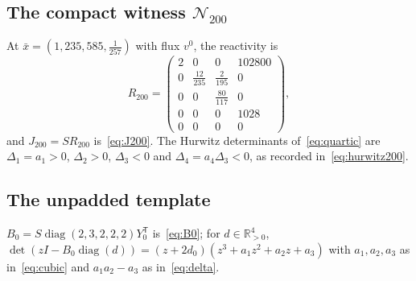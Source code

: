 \documentclass[11pt,a4paper]{article}
\theoremstyle{plain}
\theoremstyle{definition}
\theoremstyle{remark}
\newcommand{\R}{\mathbb{R}}
\newcommand{\diag}{\operatorname{diag}}
\newcommand{\xbar}{\bar{x}}
\begin{document}
\subsection*{The compact witness $\mathcal N_{200}$}
At $\xbar=(1,235,585,\frac1{257})$ with flux $v^0$, the reactivity is
\[
R_{200}=\begin{pmatrix}2&0&0&102800\\0&\frac{12}{235}&\frac{2}{195}&0\\0&0&\frac{80}{117}&0\\0&0&0&1028\\0&0&0&0\end{pmatrix},
\]
and $J_{200}=SR_{200}$ is~\eqref{eq:J200}. The Hurwitz determinants of~\eqref{eq:quartic} are $\Delta_1=a_1>0$, $\Delta_2>0$, $\Delta_3<0$ and $\Delta_4=a_4\Delta_3<0$, as recorded in~\eqref{eq:hurwitz200}.

\subsection*{The unpadded template}
$B_0=S\diag(2,3,2,2,2)Y_0^{\mathsf T}$ is~\eqref{eq:B0}; for $d\in\R^4_{>0}$, $\det(zI-B_0\diag(d))=(z+2d_0)(z^3+a_1z^2+a_2z+a_3)$ with $a_1,a_2,a_3$ as in~\eqref{eq:cubic} and $a_1a_2-a_3$ as in~\eqref{eq:delta}.



\end{document}
